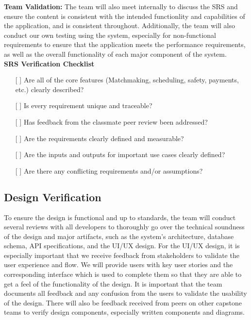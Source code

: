 \documentclass[12pt, titlepage]{article}
\begin{document}
\noindent \textbf{Team Validation:} The team will also meet internally to discuss the SRS and ensure the content is consistent with the intended functionlity and capabilities of the application, and is consistent throughout. Additionally, the team will also conduct our own testing using the system, especially for non-functional requirements to ensure that the application meets the performance requirements, as well as the overall functionality of each major component of the system. \\

\noindent \textbf{SRS Verification Checklist}
\begin{itemize}
    \item[{[ ]}] Are all of the core features (Matchmaking, scheduling, safety, payments, etc.) clearly described?
    \item[{[ ]}] Is every requirement unique and traceable?
    \item[{[ ]}] Has feedback from the classmate peer review been addressed?
    \item[{[ ]}] Are the requirements clearly defined and measurable?
    \item[{[ ]}] Are the inputs and outputs for important use cases clearly defined?
    \item[{[ ]}] Are there any conflicting requirements and/or assumptions?

\end{itemize}
\subsection{Design Verification}

To ensure the design is functional and up to standards, the team will conduct several reviews with all developers to thoroughly go over the technical soundness of the design and major artifacts, such as the system’s architecture, database schema, API specifications, and the UI/UX design. 
For the UI/UX design, it is especially important that we receive feedback from stakeholders to validate the user experience and flow. We will provide users with key user stories and the corresponding interface which is used to complete them so that they are able to get a feel of the functionality of the design. 
It is important that the team documents all feedback and any confusion from the users to validate the usability of the design. There will also be feedback received from peers on other capstone teams to verify design components, especially written components and diagrams. \\
\end{document}
